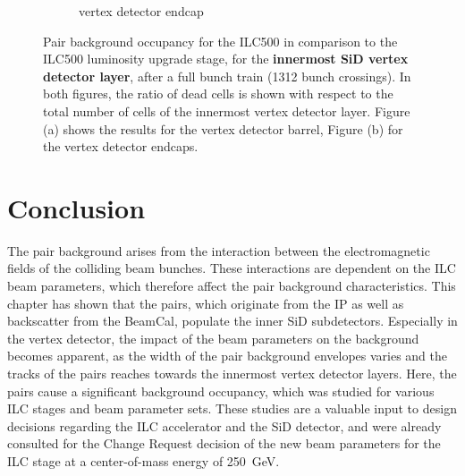 \begin{figure}
\begin{subfigure}[b]{0.49\textwidth}
   \caption{\sid vertex detector endcap}
   \end{subfigure}
   \caption[Pair background occupancy in the SiD vertex detector for the ILC500 and the ILC500 LumiUp]{Pair background occupancy for the ILC500 in comparison to the ILC500 luminosity upgrade stage, for the \textbf{innermost SiD vertex detector layer}, after a full bunch train (1312 bunch crossings).
   In both figures, the ratio of dead cells is shown with respect to the total number of cells of the innermost vertex detector layer.
   Figure (a) shows the results for the vertex detector barrel, Figure (b) for the vertex detector endcaps.
   }
   \label{fig:PairBkg:ILC500-ILC500LumiUp_Occupancy}
 \end{figure}
 
\section{Conclusion}
The pair background arises from the interaction between the electromagnetic fields of the colliding beam bunches.
These interactions are dependent on the ILC beam parameters, which therefore affect the pair background characteristics.
This chapter has shown that the pairs, which originate from the IP as well as backscatter from the BeamCal, populate the inner SiD subdetectors.
Especially in the vertex detector, the impact of the beam parameters on the background becomes apparent, as the width of the pair background envelopes varies and the tracks of the pairs reaches towards the innermost vertex detector layers.
Here, the pairs cause a significant background occupancy, which was studied for various ILC stages and beam parameter sets.
These studies are a valuable input to design decisions regarding the ILC accelerator and the SiD detector, and were already consulted for the Change Request decision of the new beam parameters for the ILC stage at a center-of-mass energy of \SI{250}{\GeV}.